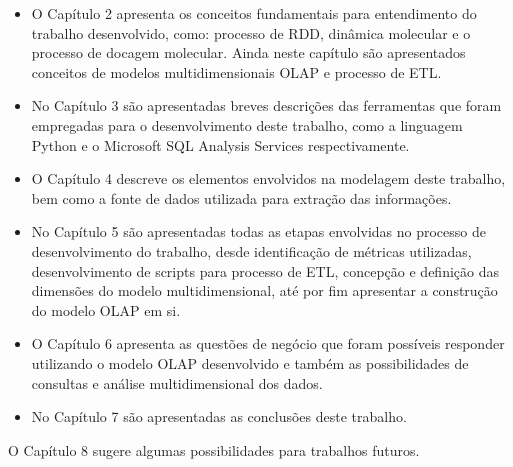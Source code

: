 \begin{itemize} 
	\item O Capítulo 2 apresenta os conceitos fundamentais para entendimento do trabalho desenvolvido, como: processo de RDD, dinâmica molecular e o processo de docagem molecular. Ainda neste capítulo são apresentados conceitos de modelos multidimensionais OLAP e processo de ETL.
	\item No Capítulo 3 são apresentadas breves descrições das ferramentas que foram empregadas para o desenvolvimento deste trabalho, como a linguagem Python e o Microsoft SQL Analysis Services respectivamente.
	\item O Capítulo 4 descreve os elementos envolvidos na modelagem deste trabalho, bem como a fonte de dados utilizada para extração das informações.
	\item No Capítulo 5 são apresentadas todas as etapas envolvidas no processo de desenvolvimento do trabalho, desde identificação de métricas utilizadas, desenvolvimento de scripts para processo de ETL, concepção e definição das dimensões do modelo multidimensional, até por fim apresentar a construção do modelo OLAP em si.
	\item O Capítulo 6 apresenta as questões de negócio que foram possíveis responder utilizando o modelo OLAP desenvolvido e também as possibilidades de consultas e análise multidimensional dos dados.
	\item No Capítulo 7 são apresentadas as conclusões deste trabalho.
\end{itemize} 
	\item O Capítulo 8 sugere algumas possibilidades para trabalhos futuros.